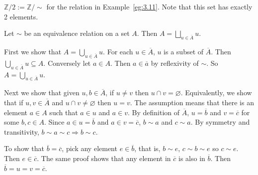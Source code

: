 \documentclass{notes}
\begin{document}
\begin{defn}
  $\mathbb Z/2 := \mathbb Z/\sim$ for the relation in Example~\ref{eg:3.11}.
  Note that this set has exactly 2 elements.
\end{defn}

\begin{prop}
  Let $\sim$ be an equivalence relation on a set $A$.
  Then $A = \bigsqcup_{u \in \overline A} u$.
\end{prop}

\begin{prf}
  First we show that $A = \bigcup_{u \in \overline A} u$.
  For each $u \in \overline A$, $u$ is a subset of $\overline A$.
  Then $\bigcup_{u \in \overline A} u \subseteq A$.
  Conversely let $a \in A$.
  Then $a \in \overline a$ by reflexivity of $\sim$.
  So $A = \bigcup_{u \in \overline A} u$.

  Next we show that given $u, b \in \overline A$, if $u \neq v$ then $u \cap v = \varnothing$.
  Equivalently, we show that if $u, v \in \overline A$ and $u \cap v \neq \varnothing$ then $u = v$.
  The assumption means that there is an element $a \in A$ such that $a \in u$ and $a \in v$.
  By definition of $\overline A$, $u = \overline b$ and $v = \overline c$ for some $b, c \in A$.
  Since $a \in u = \overline b$ and $a \in v = \overline c$, $b \sim a$ and $c \sim a$.
  By symmetry and transitivity, $b \sim a \sim c \Rightarrow b \sim c$.
  
  To show that $\overline b = \overline c$, pick any element $e \in \overline b$, that is, $b \sim e$, $c \sim b \sim e$ so $c \sim e$.
  Then $e \in \overline c$.
  The same proof shows that any element in $\overline c$ is also in $\overline b$.
  Then $\overline b = u = v = \overline c$.
\end{prf}
\end{document}
